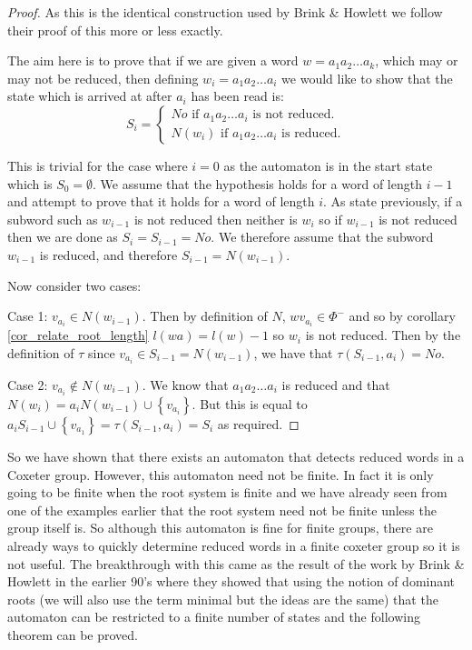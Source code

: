 \documentclass[a4paper,12pt]{article}
\begin{document}
\begin{proof}
	As this is the identical construction used by Brink \& Howlett we follow their proof of this more or less exactly. 
	
	The aim here is to prove that if we are given a word $w = a_1a_2 \ldots a_k$, which may or may not be reduced, then defining $w_i = a_1a_2 \ldots a_i$ we would like to show that the state which is arrived at after $a_i$ has been read is:
	\begin{equation*}
		S_i = 
		\begin{cases}
		No \text{ if } a_1a_2 \ldots a_i \text{ is not reduced.} \\
		N(w_i) \text{ if } a_1a_2 \ldots a_i \text{ is reduced.}
		\end{cases}
	\end{equation*}
	
	This is trivial for the case where $i = 0$ as the automaton is in the start state which is $S_0 = \emptyset$. We assume that the hypothesis holds for a word of length $i - 1$ and attempt to prove that it holds for a word of length $i$. As state previously, if a subword such as $w_{i-1}$ is not reduced then neither is $w_i$ so if $w_{i-1}$ is not reduced then we are done as $S_i = S_{i-1} = No$. We therefore assume that the subword $w_{i-1}$ is reduced, and therefore $S_{i-1} = N(w_{i-1})$. 
	
	Now consider two cases:
	
	Case 1: $v_{a_i} \in N(w_{i-1})$. Then by definition of $N$, $wv_{a_i} \in \Phi^-$ and so by corollary \ref{cor_relate_root_length} $l(wa) = l(w) - 1$ so $w_i$ is not reduced. Then by the definition of $\tau$ since $v_{a_i} \in S_{i-1} = N(w_{i-1})$, we have that $\tau(S_{i-1}, a_i) = No$.
	
	Case 2: $v_{a_i} \notin N(w_{i-1})$. We know that $a_1a_2 \ldots a_i$ is reduced and that $N(w_i) = a_iN(w_{i-1}) \cup \left\{v_{a_i}\right\}$. But this is equal to $a_iS_{i-1} \cup \left\{v_{a_1}\right\} = \tau(S_{i-1}, a_i) = S_i$ as required.
\end{proof}

So we have shown that there exists an automaton that detects reduced words in a Coxeter group. However, this automaton need not be finite. In fact it is only going to be finite when the root system is finite and we have already seen from one of the examples earlier that the root system need not be finite unless the group itself is. So although this automaton is fine for finite groups, there are already ways to quickly determine reduced words in a finite coxeter group so it is not useful. The breakthrough with this came as the result of the work by Brink \& Howlett in the earlier 90's where they showed that using the notion of dominant roots (we will also use the term minimal but the ideas are the same) that the automaton can be restricted to a finite number of states and the following theorem can be proved.
\end{document}
